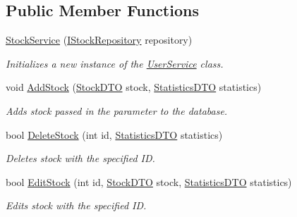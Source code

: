 \subsection*{Public Member Functions}
\begin{DoxyCompactItemize}
\item 
\mbox{\hyperlink{class_gielda_l2_1_1_i_n_f_r_a_s_t_r_u_c_t_u_r_e_1_1_services_1_1_stock_service_a19aeb6c6d5729c8333bd37c3dfe41b2d}{Stock\+Service}} (\mbox{\hyperlink{interface_gielda_l2_1_1_d_b_1_1_interfaces_1_1_i_stock_repository}{I\+Stock\+Repository}} repository)
\begin{DoxyCompactList}\small\item\em Initializes a new instance of the \mbox{\hyperlink{class_gielda_l2_1_1_i_n_f_r_a_s_t_r_u_c_t_u_r_e_1_1_services_1_1_user_service}{User\+Service}} class. \end{DoxyCompactList}\item 
void \mbox{\hyperlink{class_gielda_l2_1_1_i_n_f_r_a_s_t_r_u_c_t_u_r_e_1_1_services_1_1_stock_service_a6d019e5819834d6f1636180026d11dab}{Add\+Stock}} (\mbox{\hyperlink{class_gielda_l2_1_1_i_n_f_r_a_s_t_r_u_c_t_u_r_e_1_1_d_t_o_1_1_stock_d_t_o}{Stock\+D\+TO}} stock, \mbox{\hyperlink{class_gielda_l2_1_1_i_n_f_r_a_s_t_r_u_c_t_u_r_e_1_1_d_t_o_1_1_statistics_d_t_o}{Statistics\+D\+TO}} statistics)
\begin{DoxyCompactList}\small\item\em Adds stock passed in the parameter to the database. \end{DoxyCompactList}\item 
bool \mbox{\hyperlink{class_gielda_l2_1_1_i_n_f_r_a_s_t_r_u_c_t_u_r_e_1_1_services_1_1_stock_service_af134b397a338fcd778177bb0a4960060}{Delete\+Stock}} (int id, \mbox{\hyperlink{class_gielda_l2_1_1_i_n_f_r_a_s_t_r_u_c_t_u_r_e_1_1_d_t_o_1_1_statistics_d_t_o}{Statistics\+D\+TO}} statistics)
\begin{DoxyCompactList}\small\item\em Deletes stock with the specified ID. \end{DoxyCompactList}\item 
bool \mbox{\hyperlink{class_gielda_l2_1_1_i_n_f_r_a_s_t_r_u_c_t_u_r_e_1_1_services_1_1_stock_service_a5f14ef809d7aa93ee952adb311bc1d32}{Edit\+Stock}} (int id, \mbox{\hyperlink{class_gielda_l2_1_1_i_n_f_r_a_s_t_r_u_c_t_u_r_e_1_1_d_t_o_1_1_stock_d_t_o}{Stock\+D\+TO}} stock, \mbox{\hyperlink{class_gielda_l2_1_1_i_n_f_r_a_s_t_r_u_c_t_u_r_e_1_1_d_t_o_1_1_statistics_d_t_o}{Statistics\+D\+TO}} statistics)
\begin{DoxyCompactList}\small\item\em Edits stock with the specified ID. \end{DoxyCompactList}\item 

\end{DoxyCompactItemize}
